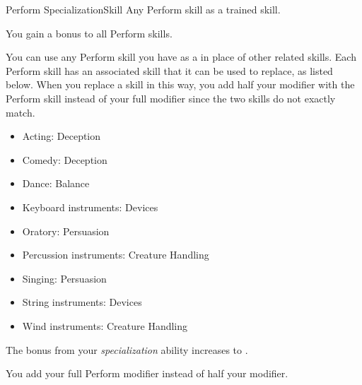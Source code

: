   \begin{feat}{Perform Specialization}{Skill}
    \featpre Any Perform skill as a trained skill.

     You gain a  bonus to all Perform skills.

     You can use any Perform skill you have as a  in place of other related skills.
    Each Perform skill has an associated skill that it can be used to replace, as listed below.
    When you replace a skill in this way, you add half your modifier with the Perform skill instead of your full modifier since the two skills do not exactly match.
    \begin{itemize}
      \item Acting: Deception
      \item Comedy: Deception
      \item Dance: Balance
      \item Keyboard instruments: Devices
      \item Oratory: Persuasion
      \item Percussion instruments: Creature Handling
      \item Singing: Persuasion
      \item String instruments: Devices
      \item Wind instruments: Creature Handling
    \end{itemize}

     The bonus from your \textit{specialization} ability increases to .

     You add your full Perform modifier instead of half your modifier.
  \end{feat}

